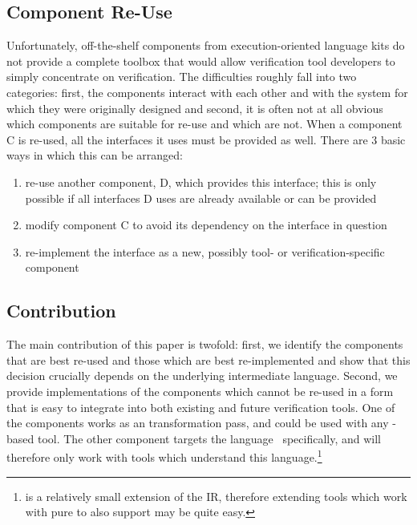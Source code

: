 \subsection{Component Re-Use}\label{component-re-use}

Unfortunately, off-the-shelf components from execution-oriented language
kits do not provide a complete toolbox that would allow verification
tool developers to simply concentrate on verification. The difficulties
roughly fall into two categories: first, the components interact with
each other and with the system for which they were originally designed
and second, it is often not at all obvious which components are suitable
for re-use and which are not. When a component C is re-used, all the
interfaces it uses must be provided as well. There are 3 basic ways in
which this can be arranged:

\begin{enumerate}
\def\labelenumi{\arabic{enumi}.}
\tightlist
\item
  re-use another component, D, which provides this interface; this is
  only possible if all interfaces D uses are already available or can be
  provided
\item
  modify component C to avoid its dependency on the interface in
  question
\item
  re-implement the interface as a new, possibly tool- or
  verification-specific component
\end{enumerate}

\subsection{Contribution}\label{contribution}

The main contribution of this paper is twofold: first, we identify the
components that are best re-used and those which are best re-implemented
and show that this decision crucially depends on the underlying
intermediate language. Second, we provide implementations of the
components which cannot be re-used in a form that is easy to integrate
into both existing and future verification tools. One of the components
works as an \llvm{} transformation pass, and could be used with any
\llvm{}-based tool. The other component targets the \divm{}
language~\cite{rockai17:divm} specifically, and will therefore only
work with tools which understand this language.\footnote{\divm{} is a
  relatively small extension of the \llvm{} IR, therefore extending tools
  which work with pure \llvm{} to also support \divm{} may be quite easy.}

